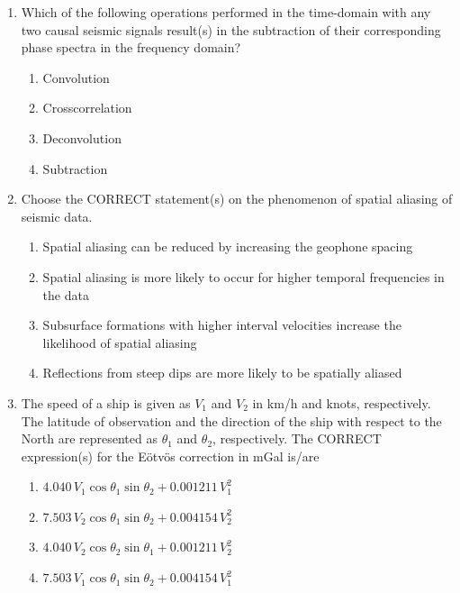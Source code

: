 \documentclass[journal,12pt,onecolumn]{IEEEtran}
\begin{document}
\begin{enumerate}
\item Which of the following operations performed in the time-domain with any two causal seismic signals result(s) in the subtraction of their corresponding phase spectra in the frequency domain?  

\hfill{}

\begin{multicols}{2}
\begin{enumerate}
\item Convolution
\item Crosscorrelation
\item Deconvolution
\item Subtraction
\end{enumerate}
\end{multicols}

\item Choose the CORRECT statement(s) on the phenomenon of spatial aliasing of seismic data.  

\hfill{}


\begin{enumerate}
\item Spatial aliasing can be reduced by increasing the geophone  spacing
\item Spatial aliasing is more likely to occur for higher temporal frequencies in the data
\item Subsurface formations with higher interval velocities increase the likelihood of spatial aliasing
\item Reflections from steep dips are more likely to be spatially aliased
\end{enumerate}


\item The speed of a ship is given as $V_1$ and $V_2$ in km/h and knots, respectively. The latitude of observation and the direction of the ship with respect to the North are represented as $\theta_1$ and $\theta_2$, respectively. The CORRECT expression(s) for the E\"otv\"os correction in mGal is/are  

\hfill{}

\begin{multicols}{1}
\begin{enumerate}
\item $4.040\,V_1\cos\theta_1\sin\theta_2+0.001211\,V_1^2$
\item $7.503\,V_2\cos\theta_1\sin\theta_2+0.004154\,V_2^2$
\item $4.040\,V_2\cos\theta_2\sin\theta_1+0.001211\,V_2^2$
\item $7.503\,V_1\cos\theta_1\sin\theta_2+0.004154\,V_1^2$
\end{enumerate}
\end{multicols}


\end{enumerate}
\end{document}
